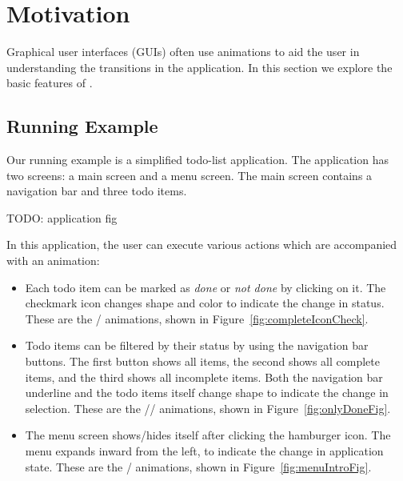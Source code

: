 \section{Motivation}
\label{sec:motivation}

Graphical user interfaces (GUIs) often use animations to aid the user in understanding the transitions in the application. In this section we explore the basic features of \dsl{}.

\subsection{Running Example}

Our running example is a simplified todo-list application. The application has two screens: a main screen and a menu screen. The main screen contains a navigation bar and three todo items.

TODO: application fig

In this application, the user can execute various actions which are accompanied with an animation:
\begin{itemize}
\item Each todo item can be marked as \emph{done} or \emph{not done} by clicking on it. The checkmark icon changes shape and color to indicate the change in status. These are the / animations, shown in Figure~\ref{fig:completeIconCheck}.
\item Todo items can be filtered by their status by using the navigation bar buttons. The first button shows all items, the second shows all complete items, and the third shows all incomplete items. Both the navigation bar underline and the todo items itself change shape to indicate the change in selection. These are the // animations, shown in Figure~\ref{fig:onlyDoneFig}.
\item The menu screen shows/hides itself after clicking the hamburger icon. The menu expands inward from the left, to indicate the change in application state. These are the / animations, shown in Figure~\ref{fig:menuIntroFig}.
\end{itemize}

